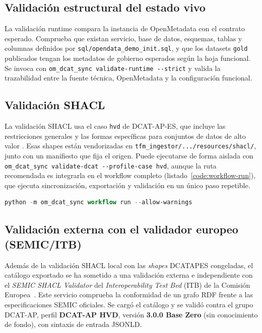 \subsection{Validación estructural del estado vivo}

La validación runtime compara la instancia de OpenMetadata con el contrato esperado. Comprueba que existan servicio, base de datos, esquemas, tablas y columnas definidos por \texttt{sql/opendata\_demo\_init.sql}, y que los datasets \texttt{gold} publicados tengan los metadatos de gobierno esperados según la hoja funcional. Se invoca con \texttt{om\_dcat\_sync validate-runtime -{}-strict} y valida la trazabilidad entre la fuente técnica, OpenMetadata y la configuración funcional.

\subsection{Validación SHACL}

La validación SHACL usa el caso \texttt{hvd} de DCAT-AP-ES, que incluye las restricciones generales y las formas específicas para conjuntos de datos de alto valor \cite{datosGobValidacionDcatApEs2025}. Esas shapes están vendorizadas en \texttt{tfm\_ingestor/.../resources/shacl/}, junto con un manifiesto que fija el origen. Puede ejecutarse de forma aislada con \texttt{om\_dcat\_sync validate-dcat -{}-profile-case hvd}, aunque la ruta recomendada es integrarla en el workflow completo (listado~\ref{code:workflow-run}), que ejecuta sincronización, exportación y validación en un único paso repetible.

\begin{lstlisting}[language=PowerShell, caption={Workflow canónico end-to-end: sincroniza gobierno, exporta DCAT-AP-ES y valida SHACL HVD.}, label=code:workflow-run, captionpos=b]
python -m om_dcat_sync workflow run --allow-warnings
\end{lstlisting}

\subsection{Validación externa con el validador europeo (SEMIC/ITB)}\label{sec:validacion-europea}

Además de la validación \ac{SHACL} local con las \emph{shapes} \ac{DCATAPES} congeladas, el catálogo exportado se ha sometido a una validación externa e independiente con el \emph{SEMIC SHACL Validator} del \emph{Interoperability Test Bed} (ITB) de la Comisión Europea~\cite{itbSemicShacl}. Este servicio comprueba la conformidad de un grafo \ac{RDF} frente a las especificaciones SEMIC oficiales. Se cargó el catálogo  y se validó contra el grupo DCAT-AP, perfil \textbf{DCAT-AP HVD}, versión \textbf{3.0.0 Base Zero} (sin conocimiento de fondo), con sintaxis de entrada \ac{JSONLD}.

